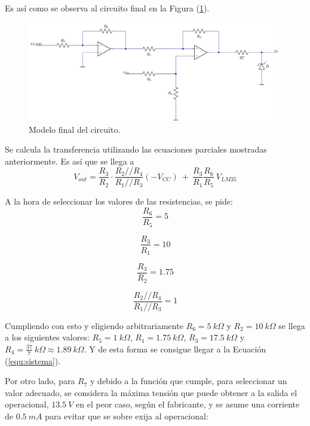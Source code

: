 \documentclass[a4paper]{article}
\begin{document}
Es así como se observa al circuito final en la Figura (\ref{fig:cirfin-M1}).

\begin{figure}[H]
	\centering
	\includegraphics[width=0.99\textwidth]{Ejercicio6/Imagenes/CircuitoFinal-M1.png}
	\caption{Modelo final del circuito.}
	\label{fig:cirfin-M1}
\end{figure}

Se calcula la transferencia utilizando las ecuaciones parciales mostradas anteriormente. Es así que se llega a
\begin{equation}
	V_{out} = \frac{R_3}{R_2} \cdot \frac{R_2 // R_4}{R_1 // R_3} \left( -V_{CC} \right) \ + \
	\frac{R_3}{R_1} \frac{R_6}{R_5} \ V_{LM35}
	\label{equ:transfm1}
\end{equation}

A la hora de seleccionar los valores de las resistencias, se pide:
\begin{equation}
	\frac{R_6}{R_5} = 5
	\label{equ:condm1-1}
\end{equation}

\begin{equation}
	\frac{R_3}{R_1} = 10
	\label{equ:condm1-2}
\end{equation}

\begin{equation}
	\frac{R_3}{R_2} = 1.75
	\label{equ:condm1-3}
\end{equation}

\begin{equation}
	\frac{R_2 // R_4}{R_1 // R_3} = 1
	\label{equ:condm1-4}
\end{equation}

Cumpliendo con esto y eligiendo arbitrariamente $R_6 = 5 \ k\Omega$ y $R_2 = 10 \ k\Omega$ se llega a los siguientes valores: $R_5 = 1 \ k\Omega$, $R_1 = 1.75 \ k\Omega$, $R_3 = 17.5 \ k\Omega$ y $R_4 = \frac{37}{7} \ k\Omega \approx 1.89 \ k\Omega$. Y de esta forma se consigue llegar a la Ecuación (\ref{equ:sistema}).

Por otro lado, para $R_7$ y debido a la función que cumple, para seleccionar un valor adecuado, se considera la máxima tensión que puede obtener a la salida el operacional, $13.5 \ V$ en el peor caso, según el fabricante, y se asume una corriente de $0.5 \ mA$ para evitar que se sobre exija al operacional:
\end{document}
